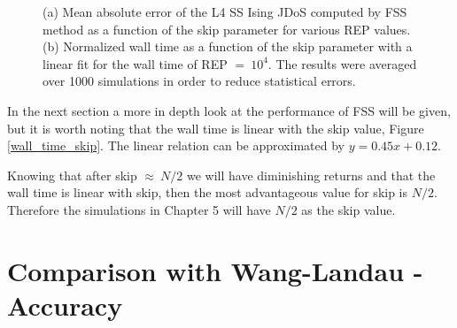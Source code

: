 \begin{figure}[h]
	\centering
	\caption{(a) Mean absolute error of the L4 SS Ising JDoS computed by FSS method as a function of the skip parameter for various REP values. (b) Normalized wall time as a function of the skip parameter with a linear fit for the wall time of REP $=\ 10^4$. The results were averaged over 1000 simulations in order to reduce statistical errors.}
\end{figure}

	In the next section a more in depth look at the performance of FSS will be given, but it is worth noting that the wall time is linear with the skip value, Figure \ref{wall_time_skip}. The linear relation can be approximated by $y=0.45x + 0.12$. 

	Knowing that after skip $\approx\ N/2$ we will have diminishing returns and that the wall time is linear with skip, then the most advantageous value for skip is $N/2$. Therefore the simulations in Chapter 5 will have $N/2$ as the skip value.

\section{Comparison with Wang-Landau - Accuracy}

























